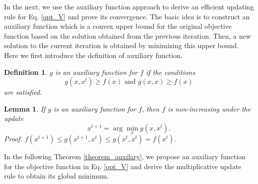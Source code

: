 \documentclass[10pt,journal,compsoc]{IEEEtran}
\newtheorem{lemma}[subsubsection]{Lemma}
\newtheorem{definition}[subsubsection]{Definition}
\begin{document}
In the next, we use the auxiliary function approach \cite{nmf_algo} to derive an efficient updating rule for Eq. \eqref{opt_V} and prove its convergence. The basic idea is to construct an auxiliary function which is a convex upper bound for the original objective function based on the solution obtained from the previous iteration. Then, a new solution to the current iteration is obtained by minimizing this upper bound. Here we first introduce the definition of auxiliary function.
\begin{definition}\cite{nmf_algo}
$\mathit{g}$ is an auxiliary function for $\mathit{f}$ if the conditions
$$\mathit{g}(x, x^t) \geq \mathit{f}(x) \textrm{ and } \mathit{g}(x, x) \geq \mathit{f}(x)$$
are satisfied.
\end{definition}
\begin{lemma}\label{lemma_auxilary}\cite{nmf_algo}
If $\mathit{g}$ is an auxiliary function for $\mathit{f}$, then $\mathit{f}$ is non-increasing under the update $$x^{t+1} = \arg \min_{x} g (x,x^t).$$
Proof. $\mathit{f}(x^{t+1}) \leq \mathit{g}(x^{t+1}, x^t) \leq \mathit{g}(x^{t}, x^t) = \mathit{f}(x^{t}).$
\end{lemma}
In the following Theorem \ref{theorem_auxilary}, we propose an auxiliary function for the objective function in Eq. \eqref{opt_V} and derive the multiplicative update rule to obtain its global minimum.
\end{document}
